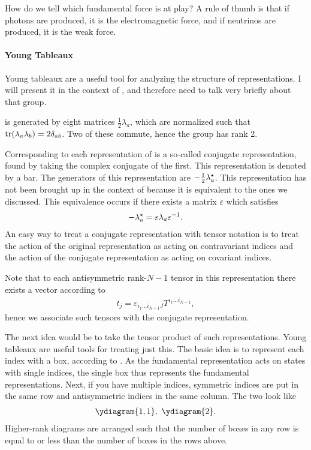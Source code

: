 How do we tell which fundamental force is at play? A rule of thumb is that if photons are produced, it is the electromagnetic force, and if neutrinos are produced, it is the weak force.

\paragraph{Young Tableaux}
Young tableaux are a useful tool for analyzing the structure of representations. I will present it in the context of , and therefore need to talk very briefly about that group.

 is generated by eight matrices $\frac{1}{2}\lambda_{a}$, which are normalized such that $\tr(\lambda_{a}\lambda_{b}) = 2\delta_{ab}$. Two of these commute, hence the group has rank 2.

Corresponding to each representation of  is a so-called conjugate representation, found by taking the complex conjugate of the first. This representation is denoted by a bar. The generators of this representation are $-\frac{1}{2}\lambda_{a}^{\star}$. This representation has not been brought up in the context of  because it is equivalent to the ones we discussed. This equivalence occurs if there exists a matrix $\varepsilon$ which satisfies
\begin{align*}
	-\lambda_{a}^{\star} = \varepsilon\lambda_{a}\varepsilon^{-1}.
\end{align*}
An easy way to treat a conjugate representation with tensor notation is to treat the action of the original representation as acting on contravariant indices and the action of the conjugate representation as acting on covariant indices.

Note that to each antisymmetric rank-$N - 1$ tensor in this representation there exists a vector according to
\begin{align*}
	t_{j} = \varepsilon_{i_{1}\dots i_{N - 1}J}T^{i_{1}\dots i_{N - 1}},
\end{align*}
hence we associate such tensors with the conjugate representation.

The next idea would be to take the tensor product of such representations. Young tableaux are useful tools for treating just this. The basic idea is to represent each index with a box, according to \ytableaushort{{}}. As the fundamental representation acts on states with single indices, the single box thus represents the fundamental representations. Next, if you have multiple indices, symmetric indices are put in the same row and antisymmetric indices in the same column. The two look like
\begin{align*}
	\ydiagram{1, 1},\ \ydiagram{2}.
\end{align*}
Higher-rank diagrams are arranged such that the number of boxes in any row is equal to or less than the number of boxes in the rows above.

